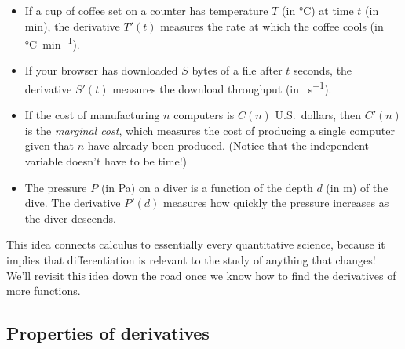 \documentclass[../book/calcnotes.tex]{subfiles}
\begin{document}
\begin{itemize}
\item
  If a cup of coffee set on a counter has temperature $T$ (in \si{\celsius}) at time $t$ (in \si{\minute}), the derivative $T'(t)$ measures the rate at which the coffee cools (in \si{\celsius\per\minute}).

\item
  If your browser has downloaded $S$ bytes of a file after $t$ seconds, the derivative $S'(t)$ measures the download throughput (in \si{\byte\per\second}).

\item
  If the cost of manufacturing $n$ computers is $C(n)$ U.S.~dollars, then $C'(n)$ is the \emph{marginal cost}, which measures the cost of producing a single computer given that $n$ have already been produced.
  (Notice that the independent variable doesn't have to be time!)

\item
  The pressure $P$ (in \si{\pascal}) on a diver is a function of the depth $d$ (in \si{\meter}) of the dive.
  The derivative $P'(d)$ measures how quickly the pressure increases as the diver descends.
\end{itemize}

This idea connects calculus to essentially every quantitative science, because it implies that differentiation is relevant to the study of anything that changes!
We'll revisit this idea down the road once we know how to find the derivatives of more functions.

\subsection{Properties of derivatives}
\label{sec:derivprops}

\begin{exercises}
\end{exercises}
\end{document}
